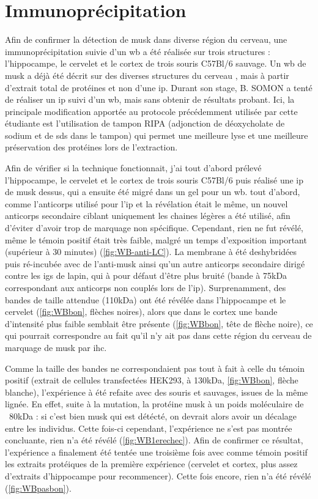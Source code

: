 	

\section{Immunoprécipitation}
\label{sec:IPresultat}
	Afin de confirmer la détection de \gls{musk} dans diverse région du cerveau, une immunoprécipitation suivie d'un \gls{wb} a été réalisée sur trois structures : l'hippocampe, le cervelet et le cortex de trois souris C57Bl/6 sauvage. Un \gls{wb} de \gls{musk} a déjà été décrit sur des diverses structures du cerveau \cite{Garcia-Osta2006}, mais à partir d'extrait total de protéines et non d'une \gls{ip}. Durant son stage, B. SOMON a tenté de réaliser un \gls{ip} suivi d'un \gls{wb}, mais sans obtenir de résultats probant. Ici, la principale modification apportée au protocole précédemment utilisée par cette étudiante est l'utilisation de tampon RIPA (adjonction de déoxycholate de sodium et de \acrshort{sds} dans le tampon) qui permet une meilleure lyse et une meilleure préservation des protéines lors de l'extraction.
	
	Afin de vérifier si la technique fonctionnait, j'ai tout d'abord prélevé l'hippocampe, le cervelet et le cortex de trois souris C57Bl/6 puis réalisé une \gls{ip} de \gls{musk} dessus, qui a ensuite été migré dans un gel pour un \gls{wb}. tout d'abord, comme l'anticorps utilisé pour l'\gls{ip} et la révélation était le même, un nouvel anticorps secondaire ciblant uniquement les chaines légères a été utilisé, afin d'éviter d'avoir trop de marquage non spécifique. Cependant, rien ne fut révélé, même le témoin positif était très faible, malgré un temps d'exposition important (supérieur à 30 minutes) (\cref{fig:WB-anti-LC}). La membrane à été deshybridées puis ré-incubée avec de l'anti-\gls{musk} ainsi qu'un autre anticorps secondaire dirigé contre les \glspl{ig} de lapin, qui à pour défaut d'être plus bruité (bande à 75kDa correspondant aux anticorps non couplés lors de l'\gls{ip}). Surprenamment, des bandes de taille attendue (110kDa) ont été révélée dans l'hippocampe et le cervelet (\cref{fig:WBbon}, flèches noires), alors que dans le cortex une bande d'intensité plus faible semblait être présente (\cref{fig:WBbon}, tête de flèche noire), ce qui pourrait correspondre au fait qu'il n'y ait pas dans cette région du cerveau de marquage de \gls{musk} par \gls{ihc}. 
	
	Comme la taille des bandes ne correspondaient pas tout à fait à celle du témoin positif (extrait de cellules transfectées HEK293, à 130kDa, \cref{fig:WBbon}, flèche blanche), l'expérience à été refaite avec des souris \mcrd et sauvages, issues de la même lignée. En effet, suite à la mutation, la protéine \gls{musk} à un poids moléculaire de ~80kDa : si c'est bien \gls{musk} qui est détécté, on devrait alors avoir un décalage entre les individus. Cette fois-ci cependant, l'expérience ne s'est pas montrée concluante, rien n'a été révélé (\cref{fig:WB1erechec}). Afin de confirmer ce résultat, l'expérience a finalement été tentée une troisième fois avec comme témoin positif les extraits protéiques de la première expérience (cervelet et cortex, plus assez d'extraits d'hippocampe pour recommencer). Cette fois encore, rien n'a été révélé (\cref{fig:WBpasbon}).
	
